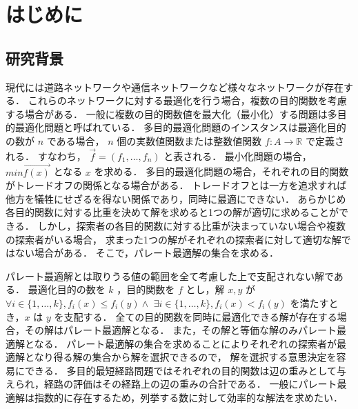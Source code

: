\documentclass[12pt]{optlab-bachelor}
\begin{document}
\frontmatter %
\chapter{はじめに}
\section{研究背景}
現代には道路ネットワークや通信ネットワークなど様々なネットワークが存在する．
これらのネットワークに対する最適化を行う場合，複数の目的関数を考慮する場合がある．
一般に複数の目的関数値を最大化（最小化）する問題は多目的最適化問題と呼ばれている．
多目的最適化問題のインスタンスは最適化目的の数が $n$ である場合，
$n$ 個の実数値関数または整数値関数 $f : A \rightarrow \mathbb{R}$ で定義される．
すなわち， $\vec{f} = (f_1 , \ldots , f_n)$ と表される．
最小化問題の場合， $min\vec{f(x)}$ となる $x$ を求める．
多目的最適化問題の場合，それぞれの目的関数がトレードオフの関係となる場合がある．
トレードオフとは一方を追求すれば他方を犠牲にせざるを得ない関係であり，同時に最適にできない．
あらかじめ各目的関数に対する比重を決めて解を求めると1つの解が適切に求めることができる．
しかし，探索者の各目的関数に対する比重が決まっていない場合や複数の探索者がいる場合，
求まった1つの解がそれぞれの探索者に対して適切な解ではない場合がある．
そこで，パレート最適解の集合を求める．


パレート最適解とは取りうる値の範囲を全て考慮した上で支配されない解である．
最適化目的の数を $k$ ，目的関数を $f$ とし，解 $x,y$ が
$\forall i \in \{1,\ldots,k\},f_i(x) \le f_i(y) \land $
$\exists i \in \{1,\ldots,k\},f_i(x) < f_i(y)$
を満たすとき，$x$ は $y$ を支配する．
全ての目的関数を同時に最適化できる解が存在する場合，その解はパレート最適解となる．
また，その解と等価な解のみパレート最適解となる．
パレート最適解の集合を求めることによりそれぞれの探索者が最適解となり得る解の集合から解を選択できるので，
解を選択する意思決定を容易にできる．
多目的最短経路問題ではそれぞれの目的関数は辺の重みとして与えられ，経路の評価はその経路上の辺の重みの合計である．
一般にパレート最適解は指数的に存在するため，列挙する数に対して効率的な解法を求めたい．
\end{document}
